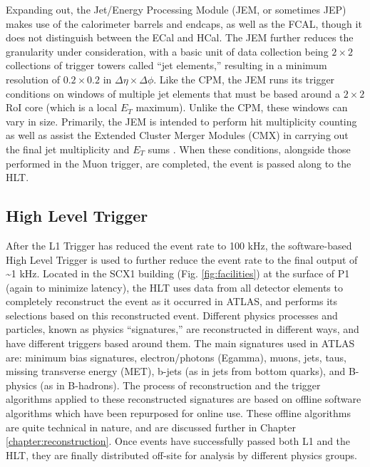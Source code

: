         Expanding out, the Jet/Energy Processing Module (JEM, or sometimes JEP) makes use of the calorimeter barrels and endcaps, as well as the FCAL, though it does not distinguish between the ECal and HCal.
        The JEM further reduces the granularity under consideration, with a basic unit of data collection being $2 \times 2$ collections of trigger towers called ``jet elements,'' resulting in a minimum resolution of $0.2 \times 0.2$ in $\Delta \eta \times \Delta \phi$.
        Like the CPM, the JEM runs its trigger conditions on windows of multiple jet elements that must be based around a $2 \times 2$ RoI core (which is a local $E_T$ maximum).
        Unlike the CPM, these windows can vary in size.
        Primarily, the JEM is intended to perform hit multiplicity counting
            as well as assist the Extended Cluster Merger Modules (CMX) in carrying out the final jet multiplicity
            and $E_T$ sums \cite{L1_calo_run1}\cite{trigger_run2}.
        When these conditions, alongside those performed in the Muon trigger, are completed, the event is passed along to the HLT.


\FloatBarrier
    \subsection{High Level Trigger}

        After the L1 Trigger has reduced the event rate to 100 kHz, the software-based High Level Trigger is used to further reduce the event rate to the final output of \textasciitilde 1 kHz.
        Located in the SCX1 building (Fig. \ref{fig:facilities}) at the surface of P1 (again to minimize latency),
            the HLT uses data from all detector elements to completely reconstruct the event as it occurred in ATLAS,
            and performs its selections based on this reconstructed event.
        Different physics processes and particles, known as physics ``signatures,'' are reconstructed in different ways, and have different triggers based around them. 
        The main signatures used in ATLAS are: minimum bias signatures, electron/photons (Egamma), muons, jets, taus, missing transverse energy (MET), b-jets (as in jets from bottom quarks), and B-physics (as in B-hadrons).
        The process of reconstruction and the trigger algorithms applied to these reconstructed signatures are based on offline software algorithms which have been repurposed for online use.
        These offline algorithms are quite technical in nature, and are discussed further in Chapter \ref{chapter:reconstruction}.
        Once events have successfully passed both L1 and the HLT, they are finally distributed off-site for analysis by different physics groups.

